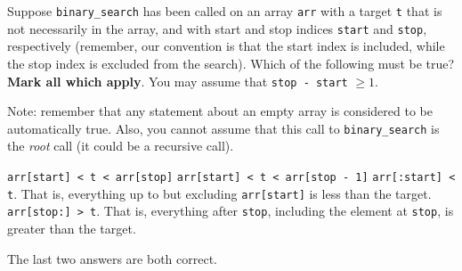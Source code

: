 \begin{prob}
    Suppose \texttt{binary_search} has been called on an array \texttt{arr}
    with a target \texttt{t} that is not necessarily in the array, and with
    start and stop indices \texttt{start} and \texttt{stop}, respectively
    (remember, our convention is that the start index is included, while the
    stop index is excluded from the search). Which of the following must be true?
    \textbf{Mark all which apply}. You may assume that \texttt{stop - start} $\geq 1$.

    Note: remember that any statement about an empty array is considered to be
    automatically true. Also, you cannot assume that this call to \texttt{binary_search}
    is the \textit{root} call (it could be a recursive call).

    \begin{choices}
        \choice  \texttt{arr[start] < t < arr[stop]}
        \choice  \texttt{arr[start] < t < arr[stop - 1]}
        \correctchoice  \texttt{arr[:start] < t}. That is, everything up to but
            excluding \texttt{arr[start]} is less than the target.
        \correctchoice  \texttt{arr[stop:] > t}. That is, everything after \texttt{stop},
            including the element at \texttt{stop}, is greater than the target.
    \end{choices}

    \begin{soln}
        The last two answers are both correct.
    \end{soln}
\end{prob}
